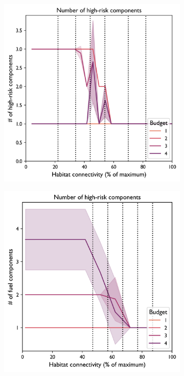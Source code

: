\begin{figure}[H]
\begin{subfigure}[b]{0.4\textwidth}
         \caption{}
         \label{fig:indicator_surface4}
     \end{subfigure}
     \hfill
     \begin{subfigure}[b]{0.4\textwidth}
         \centering
         \includegraphics[width=\textwidth]{figures/wildland/risky_components3.png}
         \caption{}
         \label{fig:indicator_component3}
     \end{subfigure}
     \begin{subfigure}[b]{0.4\textwidth}
         \centering
         \includegraphics[width=.98\textwidth]{figures/wildland/risky_component4.png}

\end{subfigure}
\end{figure}
